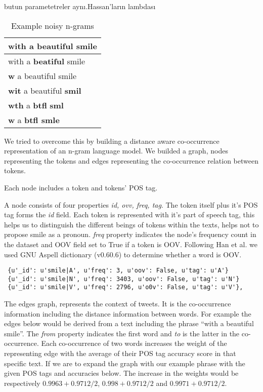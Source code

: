 butun parametetreler aynı.Hassan'ların lambdası

\begin{table}[tbhp]
\begin{centering}
\caption{Example noisy n-grams}
\label{tab:ngrams}
\begin{tabular}[h]{l}
\hline
with a beautiful smile \\
\hline
with a \textbf{beatiful} smile \\
\textbf{w} a beautiful smile \\
\textbf{wit} a beautiful \textbf{smil} \\
\textbf{wth} a \textbf{btfl} \textbf{sml} \\
\textbf{w} a \textbf{btfl smle} \\
\hline
\end{tabular}
\par\end{centering}
\end{table}





We tried to overcome this by building a distance aware co-occurrence representation of an n-gram language model. We builded a  graph, nodes representing the tokens and edges representing the co-occurrence relation between tokens.

Each node includes a token and tokens' POS tag.

A node consists of four properties \textit{id, ovv, freq, tag}. The token itself plus it's POS tag forms the \textit{id} field. Each token is represented with it's part of speech tag, this helps us to distinguish the different beings of tokens within the texts, helps not to propose smile as a pronoun. \textit{freq} property indicates the node's frequency count in the dataset and OOV field set to True if a token is OOV. Following Han et al. we used GNU Aspell dictionary (v0.60.6) to determine whether a word is OOV.

\begin{verbatim}
 {u'_id': u'smile|A', u'freq': 3, u'oov': False, u'tag': u'A'}
 {u'_id': u'smile|N', u'freq': 3403, u'oov': False, u'tag': u'N'}
 {u'_id': u'smile|V', u'freq': 2796, u'o0v': False, u'tag': u'V'},
\end{verbatim}

The edges graph, represents the context of tweets. It is the co-occurrence information including the distance information between words. For example the edges below would be derived from a text including the phrase ``with a beautiful smile''. The \textit{from} property indicates the first word and \textit{to} is the latter in the co-occurrence. Each co-occurrence of two words increases the weight of the representing edge with the average of their POS tag accuracy score in that specific text. If we are to expand the graph with our example phrase with the given POS tags and accuracies below. The increase in the weights would be respectively $0.9963+0.9712/2$, $0.998+0.9712/2$ and $0.9971+0.9712/2$.

